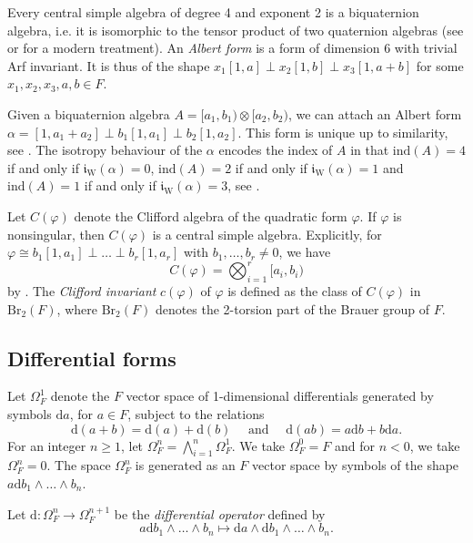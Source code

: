 \documentclass{amsart}
\numberwithin{equation}{section}
\newcommand{\iw}[1]{\mathfrak{i}_{\mathrm{W}}(#1)} %
\newcommand{\BrTwo}{\mathrm{Br}_2}
\newcommand{\ind}{\mathrm{ind}}
\newcommand{\quat}[1]{[#1)}
\newcommand{\diff}{\mathrm{d}}
\begin{document}
Every central simple algebra of degree 4 and exponent 2 is a biquaternion algebra, i.e. it is isomorphic to the tensor product of two quaternion algebras (see \cite[p. 369]{Albert_Biquaternion} or \cite[(16.1) Theorem]{KnusMerkujevRostTignol_Involutions} for a modern treatment).
    An \emph{Albert form} is a form of dimension $6$ with trivial Arf invariant. 
    It is thus of the shape $x_1[1, a] \perp x_2[1, b] \perp x_3[1, a+b]$ for some $x_1, x_2, x_3, a, b \in F$.
    
    Given a biquaternion algebra $A = \quat{a_1, b_1} \otimes \quat{a_2, b_2}$, we can attach an Albert form $\alpha = [1, a_1 + a_2] \perp b_1[1, a_1] \perp b_2[1, a_2]$.
    This form is unique up to similarity, see \cite{MammoneShapiro_AlbertForm}.
    The isotropy behaviour of the $\alpha$ encodes the index of $A$ in that $\ind(A) = 4$ if and only if $\iw\alpha = 0$, $\ind(A) = 2$ if and only if $\iw\alpha = 1$ and $\ind(A) = 1$ if and only if $\iw\alpha = 3$, see \cite[(16.5) Theorem]{KnusMerkujevRostTignol_Involutions}.
   
Let $C(\varphi)$ denote the Clifford algebra of the quadratic form $\varphi$.
If $\varphi$ is nonsingular, then $C(\varphi)$ is a central simple algebra.
Explicitly, for $\varphi \cong b_1[1, a_1] \perp \ldots \perp b_r[1, a_r]$ with $b_1, \ldots, b_r \neq 0$, we have
\[C(\varphi) = \bigotimes_{i=1}^r \quat{a_i, b_i}\]
by \cite[p. 342]{ScharlauQfHFBook}.
The \emph{Clifford invariant} $c(\varphi)$ of $\varphi$ is defined as the class of $C(\varphi)$ in $\BrTwo(F)$, where $\BrTwo(F)$ denotes the 2-torsion part of the Brauer group of $F$.

\subsection{Differential forms}

Let $\Omega^1_F$ denote the $F$ vector space of 1-dimensional differentials generated by symbols $\diff a$, for $a \in F$, subject to the relations
\[\diff(a + b) = \diff(a) + \diff(b) \quad \text{ and } \quad \diff(ab) = a\diff b + b\diff a.\]
For an integer $n \geq 1$, let $\Omega_F^n = \bigwedge_{i = 1}^n \Omega_F^1$.
We take $\Omega_F^0 = F$ and for $n < 0$, we take $\Omega_F^n = 0$.
The space $\Omega_F^n$ is generated as an $F$ vector space by symbols of the shape $a \diff b_1 \wedge \ldots \wedge b_n$.

Let $\diff: \Omega_F^{n} \to \Omega_F^{n+1}$ be the \emph{differential operator} defined by 
\[a \diff b_1 \wedge \ldots \wedge b_n \mapsto \diff a \wedge \diff b_1 \wedge \ldots \wedge b_n.\]
\end{document}
